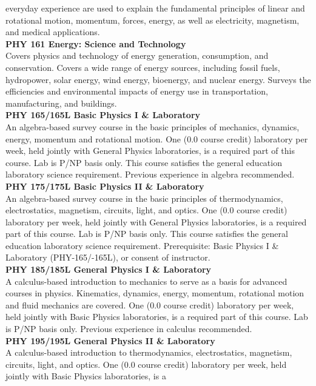 \documentclass[
  letterpaper,
]{scrbook}
\begin{document}
everyday experience are used to explain the fundamental principles of
linear and rotational motion, momentum, forces, energy, as well as
electricity, magnetism, and medical applications.\\
\textbf{PHY 161 Energy: Science and Technology}\\
Covers physics and technology of energy generation, consumption, and
conservation. Covers a wide range of energy sources, including fossil
fuels, hydropower, solar energy, wind energy, bioenergy, and nuclear
energy. Surveys the efficiencies and environmental impacts of energy use
in transportation, manufacturing, and buildings.\\
\textbf{PHY 165/165L Basic Physics I \& Laboratory}\\
An algebra-based survey course in the basic principles of mechanics,
dynamics, energy, momentum and rotational motion. One (0.0 course
credit) laboratory per week, held jointly with General Physics
laboratories, is a required part of this course. Lab is P/NP basis only.
This course satisfies the general education laboratory science
requirement. Previous experience in algebra recommended.\\
\textbf{PHY 175/175L Basic Physics II \& Laboratory}\\
An algebra-based survey course in the basic principles of
thermodynamics, electrostatics, magnetism, circuits, light, and optics.
One (0.0 course credit) laboratory per week, held jointly with General
Physics laboratories, is a required part of this course. Lab is P/NP
basis only. This course satisfies the general education laboratory
science requirement. Prerequisite: Basic Physics I \& Laboratory
(PHY-165/-165L), or consent of instructor.\\
\textbf{PHY 185/185L General Physics I \& Laboratory}\\
A calculus-based introduction to mechanics to serve as a basis for
advanced courses in physics. Kinematics, dynamics, energy, momentum,
rotational motion and fluid mechanics are covered. One (0.0 course
credit) laboratory per week, held jointly with Basic Physics
laboratories, is a required part of this course. Lab is P/NP basis only.
Previous experience in calculus recommended.\\
\textbf{PHY 195/195L General Physics II \& Laboratory}\\
A calculus-based introduction to thermodynamics, electrostatics,
magnetism, circuits, light, and optics. One (0.0 course credit)
laboratory per week, held jointly with Basic Physics laboratories, is a
\end{document}
